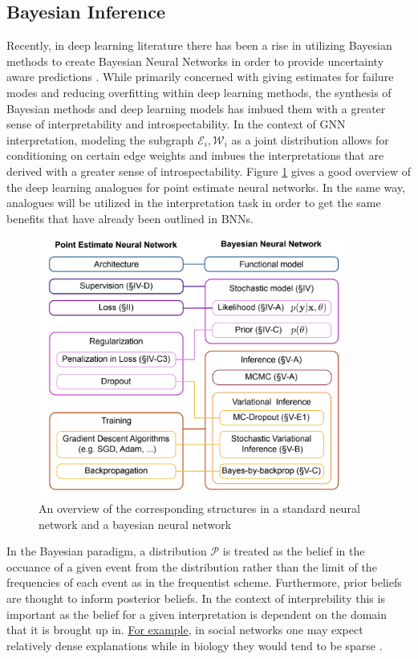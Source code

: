 \subsection{Bayesian Inference}
Recently, in deep learning literature there has been a rise in utilizing Bayesian methods to create Bayesian Neural Networks in order to provide uncertainty aware predictions \cite{jospin_hands-bayesian_2022}. While primarily concerned with giving estimates for failure modes and reducing overfitting within deep learning methods, the synthesis of Bayesian methods and deep learning models has imbued them with a greater sense of interpretability and introspectability. In the context of GNN interpretation, modeling the subgraph $\mathcal{E}_i, \mathcal{W}_i$ as a joint distribution allows for conditioning on certain edge weights and imbues the interpretations that are derived with a greater sense of introspectability. Figure \ref{fig:bnn_overview} gives a good overview of the deep learning analogues for point estimate neural networks. In the same way, analogues will be utilized in the interpretation task in order to get the same benefits that have already been outlined in BNNs.
\begin{figure}[t]
  \centering
  \includegraphics[width=0.9\textwidth]{images/bnn.jpeg}
  \caption{An overview of the corresponding structures in a standard neural network and a bayesian neural network}
  \label{fig:bnn_overview}
\end{figure}
In the Bayesian paradigm, a distribution $\mathcal{P}$ is treated as the belief in the occuance of a given event from the distribution rather than the limit of the frequencies of each event as in the frequentist scheme. Furthermore, prior beliefs are thought to inform posterior beliefs. In the context of interprebility this is important as the belief for a given interpretation is dependent on the domain that it is brought up in. \hyperref[fig:prior]{For example}, in social networks one may expect relatively dense explanations while in biology they would tend to be sparse \cite{cho_friendship_2011} \cite{petralia_new_2016}.
